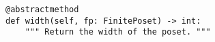 \par\begin{minipage}{60ex}
\begin{verbatim}
@abstractmethod
def width(self, fp: FinitePoset) -> int:
    """ Return the width of the poset. """
\end{verbatim}
\end{minipage}\par